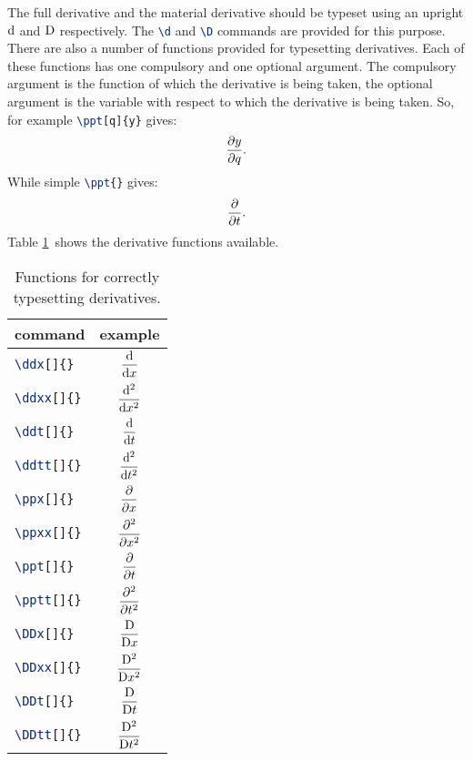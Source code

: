 The full derivative and the material derivative should be typeset using an
upright $\d$ and $\D$ respectively. The \lstinline[language=TeX]+\d+ and
\lstinline[language=TeX]+\D+ commands are provided for this purpose. There
are also a number of functions provided for typesetting derivatives. Each of
these functions has one compulsory and one optional argument. The
compulsory argument is the function of which the derivative is being taken,
the optional argument is the variable with respect to which the derivative
is being taken. So, for example \lstinline[language=TeX]+\ppt[q]{y}+ gives:
\begin{equation*}
  \ppt[q]{y}.
\end{equation*}
While simple \lstinline[language=TeX]+\ppt{}+ gives:
\begin{equation*}
  \ppt{}.
\end{equation*}
Table \ref{tab:derivatives}\ shows the derivative functions available.
\begin{table}[ht]
  \centering
  \begin{tabular}{lc}
    \textbf{command} & \textbf{example}\\\hline
    \lstinline[language=TeX]+\ddx[]{}+ & \rule{0pt}{4ex}$\displaystyle\ddx{}$\\
    \lstinline[language=TeX]+\ddxx[]{}+ & \rule{0pt}{4ex}$\displaystyle\ddxx{}$\\
    \lstinline[language=TeX]+\ddt[]{}+ & \rule{0pt}{4ex}$\displaystyle\ddt{}$\\
    \lstinline[language=TeX]+\ddtt[]{}+ & \rule{0pt}{4ex}$\displaystyle\ddtt{}$\\
    \lstinline[language=TeX]+\ppx[]{}+ & \rule{0pt}{4ex}$\displaystyle\ppx{}$\\
    \lstinline[language=TeX]+\ppxx[]{}+ & \rule{0pt}{4ex}$\displaystyle\ppxx{}$\\
    \lstinline[language=TeX]+\ppt[]{}+ & \rule{0pt}{4ex}$\displaystyle\ppt{}$\\
    \lstinline[language=TeX]+\pptt[]{}+ & \rule{0pt}{4ex}$\displaystyle\pptt{}$\\
    \lstinline[language=TeX]+\DDx[]{}+ & \rule{0pt}{4ex}$\displaystyle\DDx{}$\\
    \lstinline[language=TeX]+\DDxx[]{}+ & \rule{0pt}{4ex}$\displaystyle\DDxx{}$\\
    \lstinline[language=TeX]+\DDt[]{}+ & \rule{0pt}{4ex}$\displaystyle\DDt{}$\\
    \lstinline[language=TeX]+\DDtt[]{}+ & \rule{0pt}{4ex}$\displaystyle\DDtt{}$\\ 
  \end{tabular}
  \caption{Functions for correctly typesetting derivatives.}
  \label{tab:derivatives}
\end{table}

